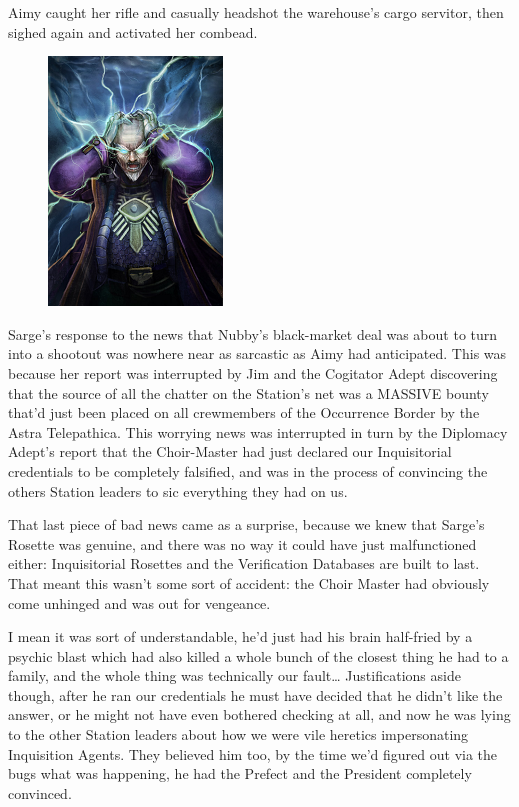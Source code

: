 Aimy caught her rifle and casually headshot the warehouse's cargo servitor, then sighed again and activated her combead.

\begin{figure}
	\begin{center}
		\includegraphics[width=\figwidth]{pics/14/23.png}
	\end{center}
\end{figure}
Sarge's response to the news that Nubby's black-market deal was about to turn into a shootout was nowhere near as sarcastic as Aimy had anticipated. 
This was because her report was interrupted by Jim and the Cogitator Adept discovering that the source of all the chatter on the Station's net was a MASSIVE bounty that'd just been placed on all crewmembers of the Occurrence Border by the Astra Telepathica. 
This worrying news was interrupted in turn by the Diplomacy Adept's report that the Choir-Master had just declared our Inquisitorial credentials to be completely falsified, and was in the process of convincing the others Station leaders to sic everything they had on us.

That last piece of bad news came as a surprise, because we knew that Sarge's Rosette was genuine, and there was no way it could have just malfunctioned either: 
Inquisitorial Rosettes and the Verification Databases are built to last. 
That meant this wasn't some sort of accident: 
the Choir Master had obviously come unhinged and was out for vengeance.

I mean it was sort of understandable, he'd just had his brain half-fried by a psychic blast which had also killed a whole bunch of the closest thing he had to a family, and the whole thing was technically our fault… Justifications aside though, after he ran our credentials he must have decided that he didn't like the answer, or he might not have even bothered checking at all, and now he was lying to the other Station leaders about how we were vile heretics impersonating Inquisition Agents. 
They believed him too, by the time we'd figured out via the bugs what was happening, he had the Prefect and the President completely convinced.

